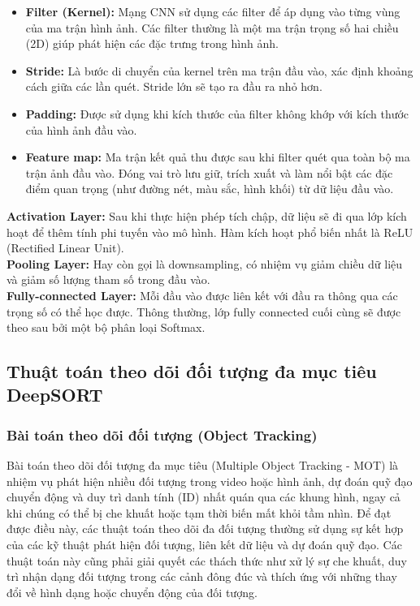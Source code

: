\documentclass[a4paper,12pt]{article}
\begin{document}
\begin{itemize}
    \item \textbf{Filter (Kernel):} Mạng CNN sử dụng các filter để áp dụng vào từng vùng của ma trận hình ảnh. Các filter thường là một ma trận trọng số hai chiều (2D) giúp phát hiện các đặc trưng trong hình ảnh.\cite{2}
    \item \textbf{Stride:} Là bước di chuyển của kernel trên ma trận đầu vào, xác định khoảng cách giữa các lần quét. Stride lớn sẽ tạo ra đầu ra nhỏ hơn.\cite{2}
    \item \textbf{Padding:} Được sử dụng khi kích thước của filter không khớp với kích thước của hình ảnh đầu vào.\cite{2}
    \item \textbf{Feature map:} Ma trận kết quả thu được sau khi filter quét qua toàn bộ ma trận ảnh đầu vào. Đóng vai trò lưu giữ, trích xuất và làm nổi bật các đặc điểm quan trọng (như đường nét, màu sắc, hình khối) từ dữ liệu đầu vào.
\end{itemize}
\textbf{Activation Layer:} Sau khi thực hiện phép tích chập, dữ liệu sẽ đi qua lớp kích hoạt để thêm tính phi tuyến vào mô hình. Hàm kích hoạt phổ biến nhất là ReLU (Rectified Linear Unit).\\
\textbf{Pooling Layer:} Hay còn gọi là downsampling, có nhiệm vụ giảm chiều dữ liệu và giảm số lượng tham số trong đầu vào.\cite{2}\\
\textbf{Fully-connected Layer:} Mỗi đầu vào được liên kết với đầu ra thông qua các trọng số có thể học được. Thông thường, lớp fully connected cuối cùng sẽ được theo sau bởi một bộ phân loại Softmax.\cite{1}

\subsection{Thuật toán theo dõi đối tượng đa mục tiêu DeepSORT}
\subsubsection{Bài toán theo dõi đối tượng (Object Tracking)} 
Bài toán theo dõi đối tượng đa mục tiêu (Multiple Object Tracking - MOT) là nhiệm vụ phát hiện nhiều đối tượng trong video hoặc hình ảnh, dự đoán quỹ đạo chuyển động và duy trì danh tính (ID) nhất quán qua các khung hình, ngay cả khi chúng có thể bị che khuất hoặc tạm thời biến mất khỏi tầm nhìn. Để đạt được điều này, các thuật toán theo dõi đa đối tượng thường sử dụng sự kết hợp của các kỹ thuật phát hiện đối tượng, liên kết dữ liệu và dự đoán quỹ đạo. Các thuật toán này cũng phải giải quyết các thách thức như xử lý sự che khuất, duy trì nhận dạng đối tượng trong các cảnh đông đúc và thích ứng với những thay đổi về hình dạng hoặc chuyển động của đối tượng.
\end{document}
